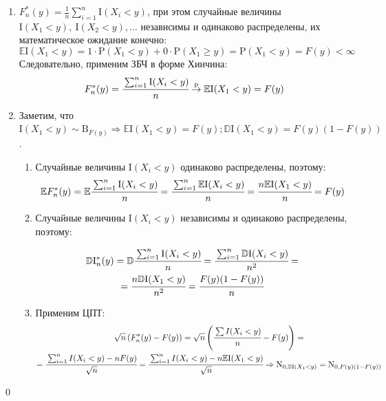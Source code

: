 \documentclass[oneside,final,14pt]{extreport}
\renewenvironment{proof}{{\bfseries Доказательство.}}{\qed}
\theoremstyle{definition}
\begin{document}
\begin{proof}\leavevmode
\begin{enumerate}
    \item \( F_{n}^{*}(y)=\frac{1}{n} \sum_{i=1}^{n} \mathrm{I}(X_{i}<y) \), при этом случайные величины \( \mathrm{I}(X_{1}<y),~ \mathrm{I}(X_{2}<y), \ldots \) независимы и одинаково распределены, их математическое ожидание конечно:
    \begin{equation*}
        \mathbb{E}\mathrm{I}(X_{1}<y)=1 \cdot \mathrm{P}(X_{1}<y)+0 \cdot \mathrm{P}(X_{1} \geqslant y)=\mathrm{P}(X_{1}<y)=F(y)<\infty
    \end{equation*}
    Следовательно, применим ЗБЧ в форме Хинчина:
    \begin{equation*}
        F_{n}^{*}(y)=\cfrac{\sum_{i=1}^{n} \mathrm{I}(X_{i}<y)}{n} \stackrel{\mathrm{p}}{\rightarrow} \mathbb{E}\mathrm{I}(X_{1}<y)=F(y) 
    \end{equation*}
    \item Заметим, что \(\mathrm{I}(X_{1}<y) \sim  \mathrm{B}_{F(y)} \Rightarrow \mathbb{E}\mathrm{I}(X_{1}<y) = F(y); \mathbb{D}\mathrm{I}(X_{1}<y) = F(y)(1-F(y)) \).
    \begin{enumerate}[label={\arabic*)}]
        \item Случайные величины \(\mathrm{I}(X_{i}<y) \) одинаково распределены, поэтому:
        \begin{equation*}
            \mathbb{E} F_{n}^{*}(y)=\mathbb{E} \cfrac{\sum_{i=1}^{n} \mathrm{I}(X_{i}<y)}{n}=\cfrac{\sum_{i=1}^{n} \mathbb{E}\mathrm{I}(X_{i}<y)}{n}=\cfrac{n \mathbb{E}\mathrm{I}(X_{1}<y)}{n}=F(y)  
        \end{equation*}
        
        \item Случайные величины \(\mathrm{I}(X_{i}<y) \) независимы и одинаково распределены, поэтому:
        
        \begin{multline*}
            \mathbb{D}\mathrm{I}_{n}^{*}(y)
            = \mathbb{D} \cfrac{\sum_{i=1}^{n} \mathrm{I}(X_{i}<y)}{n}
            = \cfrac{\sum_{i=1}^{n} \mathbb{D}\mathrm{I}(X_{i}<y)}{n^{2}}
            = \\
            = \cfrac{n\mathbb{D}\mathrm{I}(X_{1}<y)}{n^{2}}
            = \cfrac{F(y)(1-F(y))}{n}
        \end{multline*}
    
        \item Применим ЦПТ:
        \begin{multline*}
            \sqrt{n}\left(F_{n}^{*}(y)-F(y)\right)
            = \sqrt{n}\left(\cfrac{\sum I(X_{i}<y)}{n}-F(y)\right) 
            = \\
            = \cfrac{\sum_{i=1}^{n} I(X_{i}<y)-n F(y)}{\sqrt{n}} 
            = \cfrac{\sum_{i=1}^{n} I(X_{i}<y)-n \mathbb{E}\mathrm{I}(X_{1}<y)}{\sqrt{n}} \Rightarrow \mathrm{N}_{0, \mathbb{D}\mathrm{I}(X_{1}<y)}
            = \mathrm{N}_{0, F(y)(1-F(y))}
        \end{multline*}
        
    \end{enumerate}
\end{enumerate}  
\end{proof}
\end{document}
